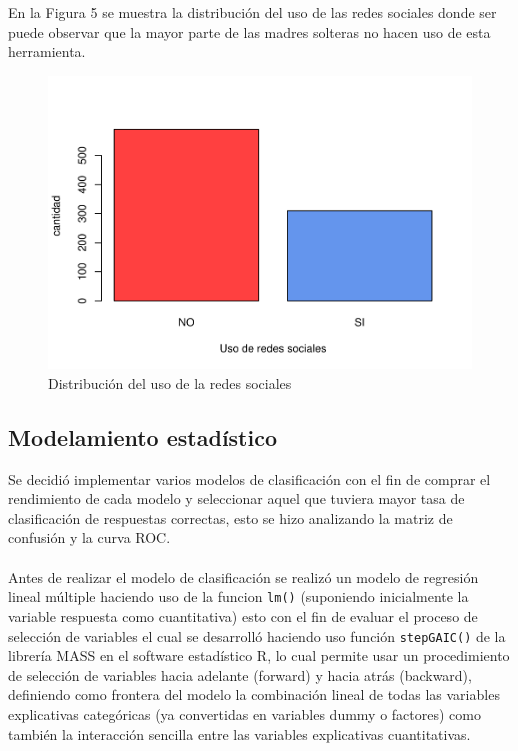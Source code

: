 \documentclass[11pt,twoside]{article}
\begin{document}
\vspace{140px}
\noindent
En la Figura 5 se muestra la distribución del uso de las redes sociales donde ser puede observar que la mayor parte de las madres solteras no hacen uso de esta herramienta.
\begin{figure}[H]
	\centering
	\includegraphics{usoderedes.pdf}
	\caption{Distribución del uso de la redes sociales}
\end{figure}



\subsection{Modelamiento estadístico}
\noindent
Se decidió implementar varios modelos de clasificación con el fin de comprar el rendimiento de cada modelo y seleccionar aquel que tuviera mayor tasa de clasificación de respuestas correctas, esto se hizo analizando la matriz de confusión y la curva ROC.  
\\
\\
Antes de realizar el modelo de clasificación se realizó un modelo de regresión lineal múltiple haciendo uso de la funcion \texttt{lm()} (suponiendo inicialmente la variable respuesta como cuantitativa) esto con el fin de evaluar el proceso de selección de variables el cual se desarrolló haciendo uso función \texttt{stepGAIC()} de la librería MASS en el software estadístico R, lo cual permite usar un procedimiento de selección de variables hacia adelante (forward) y hacia atrás (backward), definiendo como frontera del modelo la combinación lineal de todas las variables explicativas categóricas (ya convertidas en variables dummy o factores) como también la interacción sencilla entre las variables explicativas cuantitativas.
\end{document}
